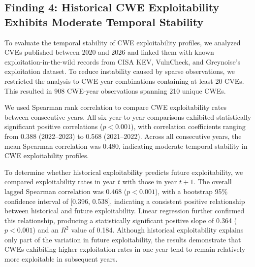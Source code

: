 \documentclass[conference,compsoc]{IEEEtran}
\begin{document}




\subsection{Finding 4: Historical CWE Exploitability Exhibits Moderate Temporal Stability}

To evaluate the temporal stability of CWE exploitability profiles, we analyzed CVEs published between 2020 and 2026 and linked them with known exploitation-in-the-wild records from CISA KEV, VulnCheck, and Greynoise's exploitation dataset. To reduce instability caused by sparse observations, we restricted the analysis to CWE-year combinations containing at least 20 CVEs. This resulted in 908 CWE-year observations spanning 210 unique CWEs.

We used Spearman rank correlation to compare CWE exploitability rates between consecutive years. All six year-to-year comparisons exhibited statistically significant positive correlations ($p<0.001$), with correlation coefficients ranging from 0.388 (2022--2023) to 0.568 (2021--2022). Across all consecutive years, the mean Spearman correlation was 0.480, indicating moderate temporal stability in CWE exploitability profiles.

To determine whether historical exploitability predicts future exploitability, we compared exploitability rates in year $t$ with those in year $t+1$. The overall lagged Spearman correlation was 0.468 ($p<0.001$), with a bootstrap 95\% confidence interval of [0.396, 0.538], indicating a consistent positive relationship between historical and future exploitability. Linear regression further confirmed this relationship, producing a statistically significant positive slope of 0.364 ($p<0.001$) and an $R^2$ value of 0.184. Although historical exploitability explains only part of the variation in future exploitability, the results demonstrate that CWEs exhibiting higher exploitation rates in one year tend to remain relatively more exploitable in subsequent years.
\end{document}
